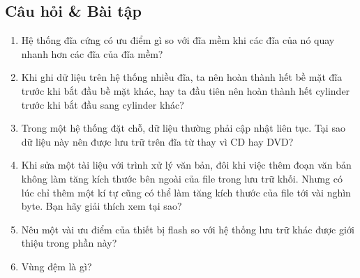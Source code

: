 \subsection*{Câu hỏi \& Bài tập}

\begin{enumerate}
\item Hệ thống đĩa cứng có ưu điểm gì so với đĩa mềm khi các đĩa của nó quay nhanh hơn các
  đĩa của đĩa mềm?

\item Khi ghi dữ liệu trên hệ thống nhiều đĩa, ta nên hoàn thành hết bề mặt đĩa trước khi
  bắt đầu bề mặt khác, hay ta đầu tiên nên hoàn thành hết cylinder trước khi bắt đầu sang
  cylinder khác?

\item Trong một hệ thống đặt chỗ, dữ liệu thường phải cập nhật liên tục. Tại sao dữ liệu
  này nên được lưu trữ trên đĩa từ thay vì CD hay DVD?

\item Khi sửa một tài liệu với trình xử lý văn bản, đôi khi việc thêm đoạn văn bản không
  làm tăng kích thước bên ngoài của file trong lưu trữ khối. Nhưng có lúc chỉ thêm một kí
  tự cũng có thể làm tăng kích thước của file tới vài nghìn byte. Bạn hãy giải thích xem
  tại sao?

\item Nêu một vài ưu điểm của thiết bị flash so với hệ thống lưu trữ khác được giới thiệu
  trong phần này?


\item Vùng đệm là gì?
  
\end{enumerate}


  

